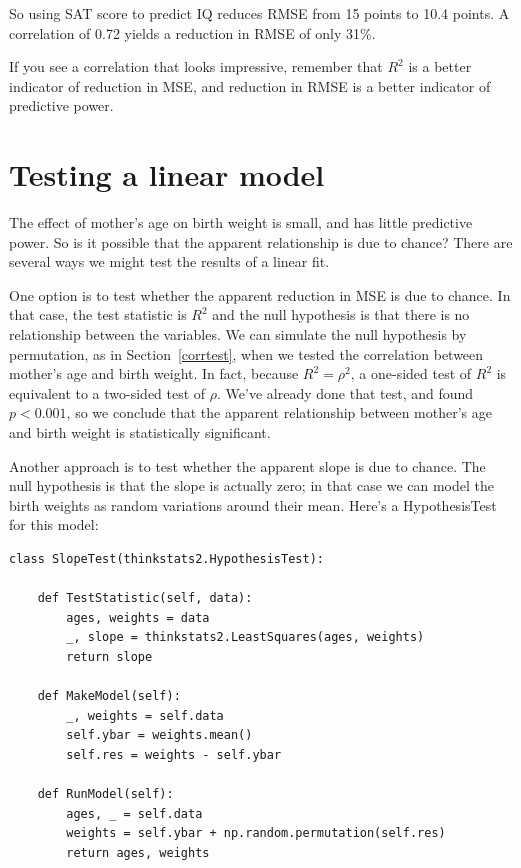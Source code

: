 \documentclass[12pt]{book}
\begin{document}
So using SAT score to predict IQ reduces RMSE from 15 points to 10.4
points.  A correlation of 0.72 yields a reduction in RMSE of only
31\%.

If you see a correlation that looks impressive, remember that $R^2$ is
a better indicator of reduction in MSE, and reduction in RMSE is a
better indicator of predictive power.


\section{Testing a linear model}

The effect of mother's age on birth weight is small, and has little
predictive power.  So is it possible that the apparent relationship
is due to chance?  There are several ways we might test the
results of a linear fit.

One option is to test whether the apparent reduction in MSE is due to
chance.  In that case, the test statistic is $R^2$ and the null
hypothesis is that there is no relationship between the variables.  We
can simulate the null hypothesis by permutation, as in
Section~\ref{corrtest}, when we tested the correlation between
mother's age and birth weight.  In fact, because $R^2 = \rho^2$, a
one-sided test of $R^2$ is equivalent to a two-sided test of $\rho$.
We've already done that test, and found $p < 0.001$, so we conclude
that the apparent relationship between mother's age and birth weight
is statistically significant.
   

Another approach is to test whether the apparent slope is due to chance.
The null hypothesis is that the slope is actually zero; in that case
we can model the birth weights as random variations around their mean.
Here's a HypothesisTest for this model:

\begin{verbatim}
class SlopeTest(thinkstats2.HypothesisTest):

    def TestStatistic(self, data):
        ages, weights = data
        _, slope = thinkstats2.LeastSquares(ages, weights)
        return slope

    def MakeModel(self):
        _, weights = self.data
        self.ybar = weights.mean()
        self.res = weights - self.ybar

    def RunModel(self):
        ages, _ = self.data
        weights = self.ybar + np.random.permutation(self.res)
        return ages, weights
\end{verbatim}
\end{document}
